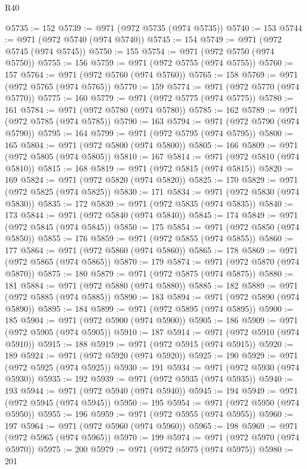 \begin{lexlean}{R40}
\begin{coremodule}
@5735 := 152
@5739 := @971 (@972 @5735 (@974 @5735))
@5740 := 153
@5744 := @971 (@972 @5740 (@974 @5740))
@5745 := 154
@5749 := @971 (@972 @5745 (@974 @5745))
@5750 := 155
@5754 := @971 (@972 @5750 (@974 @5750))
@5755 := 156
@5759 := @971 (@972 @5755 (@974 @5755))
@5760 := 157
@5764 := @971 (@972 @5760 (@974 @5760))
@5765 := 158
@5769 := @971 (@972 @5765 (@974 @5765))
@5770 := 159
@5774 := @971 (@972 @5770 (@974 @5770))
@5775 := 160
@5779 := @971 (@972 @5775 (@974 @5775))
@5780 := 161
@5784 := @971 (@972 @5780 (@974 @5780))
@5785 := 162
@5789 := @971 (@972 @5785 (@974 @5785))
@5790 := 163
@5794 := @971 (@972 @5790 (@974 @5790))
@5795 := 164
@5799 := @971 (@972 @5795 (@974 @5795))
@5800 := 165
@5804 := @971 (@972 @5800 (@974 @5800))
@5805 := 166
@5809 := @971 (@972 @5805 (@974 @5805))
@5810 := 167
@5814 := @971 (@972 @5810 (@974 @5810))
@5815 := 168
@5819 := @971 (@972 @5815 (@974 @5815))
@5820 := 169
@5824 := @971 (@972 @5820 (@974 @5820))
@5825 := 170
@5829 := @971 (@972 @5825 (@974 @5825))
@5830 := 171
@5834 := @971 (@972 @5830 (@974 @5830))
@5835 := 172
@5839 := @971 (@972 @5835 (@974 @5835))
@5840 := 173
@5844 := @971 (@972 @5840 (@974 @5840))
@5845 := 174
@5849 := @971 (@972 @5845 (@974 @5845))
@5850 := 175
@5854 := @971 (@972 @5850 (@974 @5850))
@5855 := 176
@5859 := @971 (@972 @5855 (@974 @5855))
@5860 := 177
@5864 := @971 (@972 @5860 (@974 @5860))
@5865 := 178
@5869 := @971 (@972 @5865 (@974 @5865))
@5870 := 179
@5874 := @971 (@972 @5870 (@974 @5870))
@5875 := 180
@5879 := @971 (@972 @5875 (@974 @5875))
@5880 := 181
@5884 := @971 (@972 @5880 (@974 @5880))
@5885 := 182
@5889 := @971 (@972 @5885 (@974 @5885))
@5890 := 183
@5894 := @971 (@972 @5890 (@974 @5890))
@5895 := 184
@5899 := @971 (@972 @5895 (@974 @5895))
@5900 := 185
@5904 := @971 (@972 @5900 (@974 @5900))
@5905 := 186
@5909 := @971 (@972 @5905 (@974 @5905))
@5910 := 187
@5914 := @971 (@972 @5910 (@974 @5910))
@5915 := 188
@5919 := @971 (@972 @5915 (@974 @5915))
@5920 := 189
@5924 := @971 (@972 @5920 (@974 @5920))
@5925 := 190
@5929 := @971 (@972 @5925 (@974 @5925))
@5930 := 191
@5934 := @971 (@972 @5930 (@974 @5930))
@5935 := 192
@5939 := @971 (@972 @5935 (@974 @5935))
@5940 := 193
@5944 := @971 (@972 @5940 (@974 @5940))
@5945 := 194
@5949 := @971 (@972 @5945 (@974 @5945))
@5950 := 195
@5954 := @971 (@972 @5950 (@974 @5950))
@5955 := 196
@5959 := @971 (@972 @5955 (@974 @5955))
@5960 := 197
@5964 := @971 (@972 @5960 (@974 @5960))
@5965 := 198
@5969 := @971 (@972 @5965 (@974 @5965))
@5970 := 199
@5974 := @971 (@972 @5970 (@974 @5970))
@5975 := 200
@5979 := @971 (@972 @5975 (@974 @5975))
@5980 := 201

\end{coremodule}
\end{lexlean}

